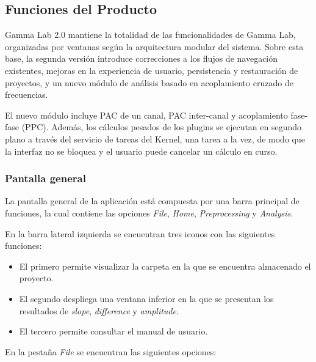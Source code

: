 \documentclass[12pt, letterpaper]{article}
\begin{document}
\subsection{Funciones del Producto}

Gamma Lab 2.0 mantiene la totalidad de las funcionalidades de Gamma Lab,
organizadas por ventanas según la arquitectura modular del sistema. Sobre
esta base, la segunda versión introduce correcciones a los flujos de
navegación existentes, mejoras en la experiencia de usuario, persistencia y
restauración de proyectos, y un nuevo módulo de análisis basado en
acoplamiento cruzado de frecuencias.

El nuevo módulo incluye PAC de un canal, PAC inter-canal y acoplamiento fase-fase
(PPC). Además, los cálculos pesados de los plugins se ejecutan en segundo plano
a través del servicio de tareas del Kernel, una tarea a la vez, de modo que la
interfaz no se bloquea y el usuario puede cancelar un cálculo en curso.

\subsubsection{Pantalla general}

La pantalla general de la aplicación está compuesta por una barra principal
de funciones, la cual contiene las opciones \textit{File}, \textit{Home},
\textit{Preprocessing} y \textit{Analysis}.

En la barra lateral izquierda se encuentran tres iconos con las siguientes
funciones:

\begin{itemize}

    \item El primero permite visualizar la carpeta en la que se encuentra
    almacenado el proyecto.

    \item El segundo despliega una ventana inferior en la que se presentan
    los resultados de \textit{slope}, \textit{difference} y \textit{amplitude}.

    \item El tercero permite consultar el manual de usuario.

\end{itemize}

En la pestaña \textit{File} se encuentran las siguientes opciones:
\end{document}
